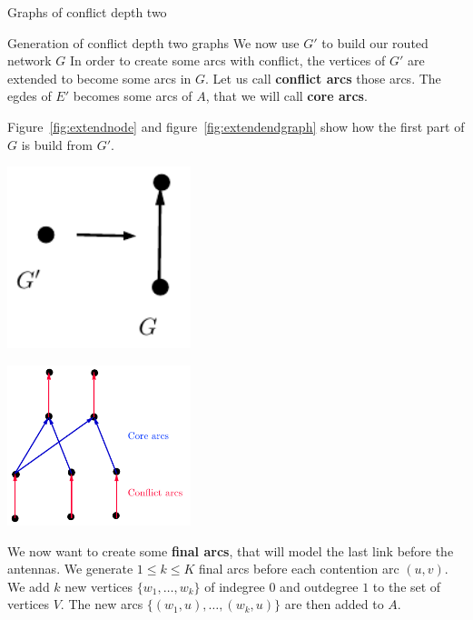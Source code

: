 \documentclass[10pt]{article}
\begin{document}
\begin{section}{Graphs of conflict depth two}
\begin{subsection}{Generation of conflict depth two graphs}
We now use $G'$ to build our routed network $G$
In order to create some arcs with conflict, the vertices of $G'$ are extended to become some arcs in $G$. Let us call \textbf{conflict arcs} those arcs. The egdes of $E'$ becomes some arcs of $A$, that we will call \textbf{core arcs}.

Figure~\ref{fig:extendnode} and figure~\ref{fig:extendendgraph} show how the first part of $G$ is build from $G'$.

\begin{minipage}{.5\linewidth}

\begin{center}
\includegraphics[width=0.4\textwidth]{extendnode}
\label{fig:extendnode}
\end{center}

\end{minipage}
\begin{minipage}{.5\linewidth}

\begin{center}
\includegraphics[width=0.4\textwidth]{extendendgraph}
\label{fig:extendendgraph}
\end{center}

\end{minipage}

 We now want to create some \textbf{final arcs}, that will model the last link before the antennas.
We generate $1\leq k\leq K$ final arcs before each contention arc $(u,v)$. We add $k$ new vertices $\{w_1,\ldots,w_k\}$ of indegree $0$ and outdegree $1$ to the set of vertices $V$. The new arcs $\{(w_1,u),\ldots,(w_k,u)\}$ are then added to $A$. 


\end{subsection}
\end{section}
\end{document}
